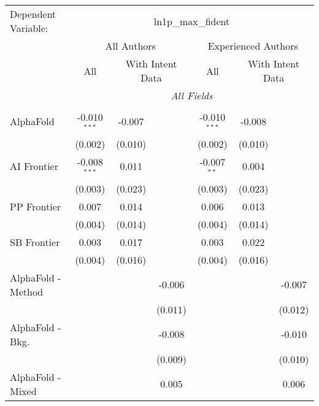 \begingroup
\centering
\begin{tabular}{lcccccc}
   \tabularnewline \midrule \midrule
   Dependent Variable: & \multicolumn{6}{c}{ln1p\_max\_fident}\\
 & \multicolumn{3}{c}{All Authors} & \multicolumn{3}{c}{Experienced Authors} \\
\cmidrule(lr){2-4} \cmidrule(lr){5-7}
 & \multicolumn{1}{c}{All} & \multicolumn{2}{c}{With Intent Data} & \multicolumn{1}{c}{All} & \multicolumn{2}{c}{With Intent Data} \\
\cmidrule(lr){2-2} \cmidrule(lr){3-4} \cmidrule(lr){5-5} \cmidrule(lr){6-7}
 & \multicolumn{6}{c}{\textit{All Fields}} \\ \\
   AlphaFold            & -0.010$^{***}$ & -0.007  &           & -0.010$^{***}$ & -0.008  &   \\   
                        & (0.002)        & (0.010) &           & (0.002)        & (0.010) &   \\   
   AI Frontier          & -0.008$^{***}$ & 0.011   &           & -0.007$^{**}$  & 0.004   &   \\   
                        & (0.003)        & (0.023) &           & (0.003)        & (0.023) &   \\   
   PP Frontier          & 0.007          & 0.014   &           & 0.006          & 0.013   &   \\   
                        & (0.004)        & (0.014) &           & (0.004)        & (0.014) &   \\   
   SB Frontier          & 0.003          & 0.017   &           & 0.003          & 0.022   &   \\   
                        & (0.004)        & (0.016) &           & (0.004)        & (0.016) &   \\   
   AlphaFold - Method   &                &         & -0.006    &                &         & -0.007\\   
                        &                &         & (0.011)   &                &         & (0.012)\\   
   AlphaFold - Bkg.     &                &         & -0.008    &                &         & -0.010\\   
                        &                &         & (0.009)   &                &         & (0.010)\\   
   AlphaFold - Mixed    &                &         & 0.005     &                &         & 0.006\\   

\end{tabular}
